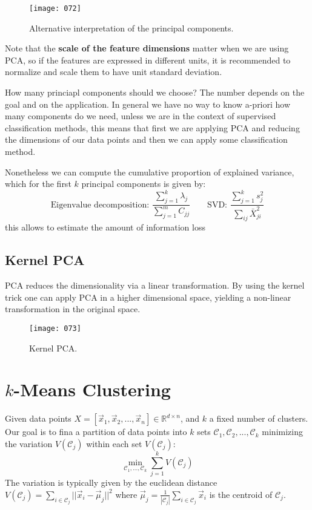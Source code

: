\begin{figure}[h!]
    \centering
    \texttt{[image: 072]}
    \caption{Alternative interpretation of the principal components.}
    \label{fig:072}
\end{figure}

Note that the \textbf{scale of the feature dimensions} matter when we are using PCA, so if the features are expressed in different units, it is recommended to normalize and scale them to have unit standard deviation. 

How many princiapl components should we choose? The number depends on the goal and on the application. In general we have no way to know a-priori how many components do we need, unless we are in the context of supervised classification methods, this means that first we are applying PCA and reducing the dimensions of our data points and then we can apply some classification method.

Nonetheless we can compute the cumulative proportion of explained variance, which for the first \(k\) principal components is given by:
\begin{equation}
    \text{Eigenvalue decomposition: } \frac {\sum_{j=1}^k \lambda_j} {\sum_{j=1}^m C_{jj}} \qquad \text{SVD: } \frac {\sum_{j=1}^k s_j^2} {\sum_{ij} \bar{X}_{ji}^2}
\end{equation}
this allows to estimate the amount of information loss

\subsection{Kernel PCA}
PCA reduces the dimensionality via a linear transformation. By using the kernel trick one can apply PCA in a higher dimensional space, yielding a non-linear transformation in the original space.

\begin{figure}[h!]
    \centering
    \texttt{[image: 073]}
    \caption{Kernel PCA.}
    \label{fig:073}
\end{figure}

\section{\(k\)-Means Clustering}
Given data points \(X = \left[ \vec{x}_1, \vec{x}_2, ..., \vec{x}_n \right] \in \mathbb{R}^{d \times n} \), and \(k\) a fixed number of clusters. Our goal is to fina a partition of data points into \(k\) sets \(\mathcal{C}_1, \mathcal{C}_2, ..., \mathcal{C}_k\) minimizing the variation \(V(\mathcal{C}_j)\) within each set \(V(\mathcal{C}_j)\):
\begin{equation}
    \min_{\mathcal{C}_1, ..., \mathcal{C}_k} \sum_{j=1}^k V(\mathcal{C}_j)
\end{equation}
The variation is typically given by the euclidean distance \(V(\mathcal{C}_j) = \sum_{i \in \mathcal{C}_j} || \vec{x}_i - \vec{\mu}_j ||^2\) where \(\vec{\mu}_j = \frac 1 {|\mathcal{C}_j|} \sum_{i \in \mathcal{C}_j} \vec{x}_i\) is the centroid of \(\mathcal{C}_j\).

